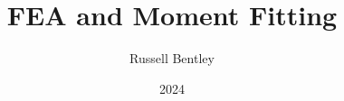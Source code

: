 \documentclass{beamer}
\title{FEA and Moment Fitting}
\author{Russell Bentley}
\institute{Stony Brook}
\date{2024}
\begin{document}
\frame{\titlepage}


\end{document}
